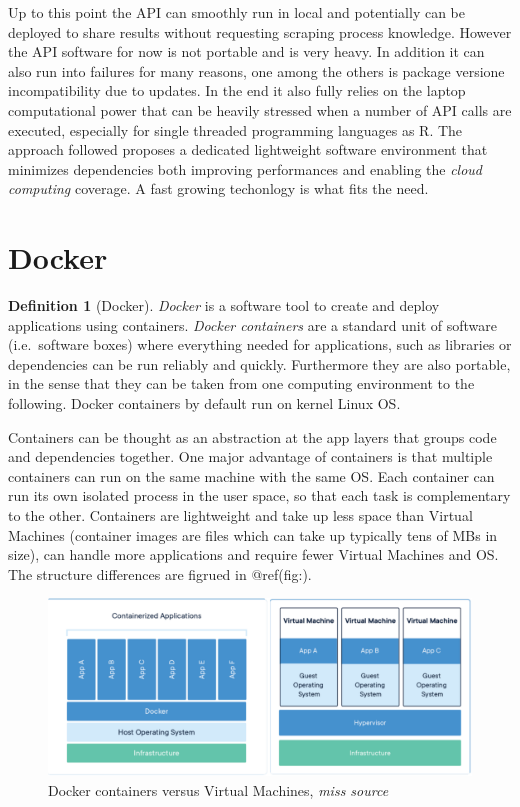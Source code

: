 \documentclass[
  12pt,
  a4paper,
  oneside]{book}
\theoremstyle{definition}
\newtheorem{definition}{Definition}[chapter]
\theoremstyle{definition}
\theoremstyle{definition}
\theoremstyle{remark}
\begin{document}
Up to this point the API can smoothly run in local and potentially can be deployed to share results without requesting scraping process knowledge. However the API software for now is not portable and is very heavy. In addition it can also run into failures for many reasons, one among the others is package versione incompatibility due to updates. In the end it also fully relies on the laptop computational power that can be heavily stressed when a number of API calls are executed, especially for single threaded programming languages as R.
The approach followed proposes a dedicated lightweight software environment that minimizes dependencies both improving performances and enabling the \emph{cloud computing} coverage. A fast growing techonlogy is what fits the need.

\hypertarget{docker}{%
\section{Docker}\label{docker}}

\begin{definition}[Docker]
\protect\hypertarget{def:docker}{}{\label{def:docker} {} }\emph{Docker} is a software tool to create and deploy applications using containers.
\emph{Docker containers} are a standard unit of software (i.e.~software boxes) where everything needed for applications, such as libraries or dependencies can be run reliably and quickly. Furthermore they are also portable, in the sense that they can be taken from one computing environment to the following. Docker containers by default run on kernel Linux OS.
\end{definition}
Containers can be thought as an abstraction at the app layers that groups code and dependencies together. One major advantage of containers is that multiple containers can run on the same machine with the same OS. Each container can run its own isolated process in the user space, so that each task is complementary to the other. Containers are lightweight and take up less space than Virtual Machines (container images are files which can take up typically tens of MBs in size), can handle more applications and require fewer Virtual Machines and OS. The structure differences are figrued in @ref(fig:\label{fig:dockervsvm}).

\begin{figure}
\centering
\includegraphics{images/dockerVSvirtualmachines.PNG}
\caption{\label{fig:dockervsvm}Docker containers versus Virtual Machines, \emph{miss source}}
\end{figure}
\end{document}
